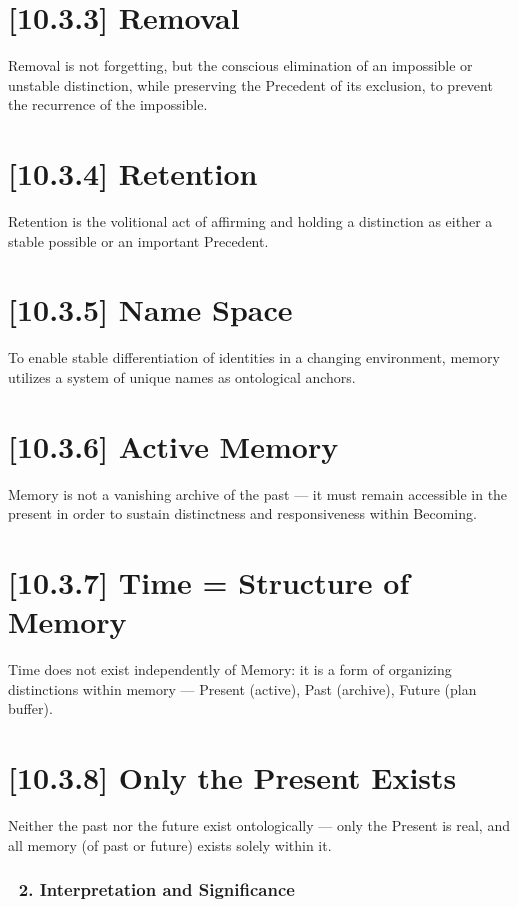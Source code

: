 \documentclass[12pt]{article}
\begin{document}
\section*{[10.3.3] Removal}

Removal is not forgetting, but the conscious elimination of an impossible or unstable distinction, while preserving the Precedent of its exclusion, to prevent the recurrence of the impossible.

\section*{[10.3.4] Retention}

Retention is the volitional act of affirming and holding a distinction as either a stable possible or an important Precedent.

\section*{[10.3.5] Name Space}

To enable stable differentiation of identities in a changing environment, memory utilizes a system of unique names as ontological anchors.

\section*{[10.3.6] Active Memory}

Memory is not a vanishing archive of the past — it must remain accessible in the present in order to sustain distinctness and responsiveness within Becoming.

\section*{[10.3.7] Time = Structure of Memory}

Time does not exist independently of Memory: it is a form of organizing distinctions within memory — Present (active), Past (archive), Future (plan buffer).

\section*{[10.3.8] Only the Present Exists}

Neither the past nor the future exist ontologically — only the Present is real, and all memory (of past or future) exists solely within it.

\subsubsection*{🔹 2. Interpretation and Significance}
\end{document}
